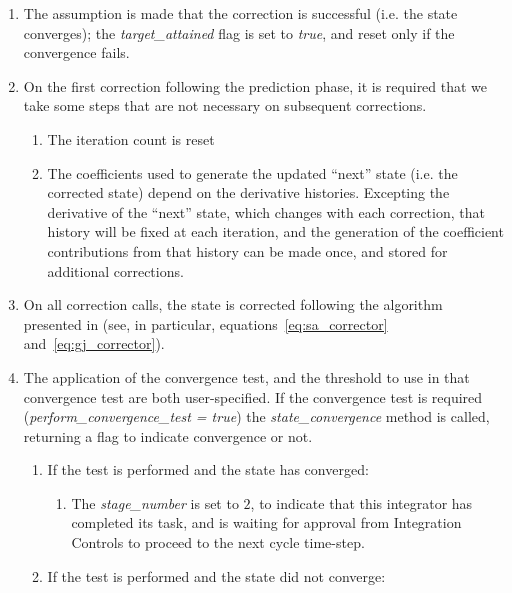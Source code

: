 \begin{enumerate}
\item The assumption is made that the correction is successful (i.e. the
state converges); the \textit{target\_attained} flag is set to \textit{true},
and reset only if the convergence fails.
\item On the first correction following the prediction phase, it is
required that we take some steps that are not necessary on subsequent
corrections.

\begin{enumerate}
\item The iteration count is reset

\item The coefficients used to generate the updated
{\textquotedblleft}next{\textquotedblright} state (i.e. the corrected
state) depend on the derivative histories. Excepting the derivative
of the {\textquotedblleft}next{\textquotedblright} state, which changes
with each correction, that history will be fixed at each iteration, and
the generation of the coefficient contributions from that history can
be made once, and stored for additional corrections.
\end{enumerate}

\item On all correction calls, the state is corrected following the
algorithm presented in  (see, in 
particular, equations~\ref{eq:sa_corrector} and~\ref{eq:gj_corrector}).

\item The application of the convergence test, and the threshold to use
in that convergence test are both user-specified. If the convergence
test is required (\textit{perform\_convergence\_test = true}) the
\textit{state\_convergence} method is called, returning a flag to
indicate convergence or not.

\begin{enumerate}
\item  If the test is performed and the state has converged:

\begin{enumerate}
\item The \textit{stage\_number} is set to $2$, to indicate that this
integrator has completed its task, and is waiting for approval from
Integration Controls to proceed to the next cycle time-step.
\end{enumerate}
\item If the test is performed and the state did not converge:


\end{enumerate}
\end{enumerate}
